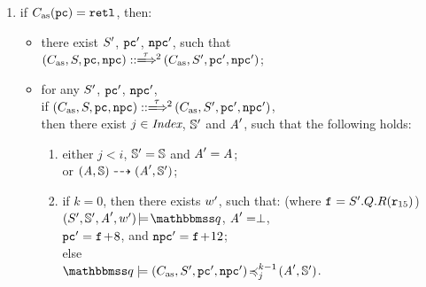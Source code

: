 \begin{definition}
\begin{enumerate}[1.]
        \item if {\em $C_{\text{as}}(\texttt{pc}) = \texttt{retl}{}$}, then:
            \begin{itemize}
                \item there exist $S'$, {\em $\texttt{pc}'$}, {\em $\texttt{npc}'$},
                such that \\
                   {\em $\LGlobMultiTrans{(\asmimp, \state, \pc, \npc)}
                            {\empmsg\,}{2}{(\asmimp, \state', \pc', \npc')}$};
                \item for any $S'$, {\em $\texttt{pc}'$}, {\em $\texttt{npc}'$}, \\
                    if {\em $\LGlobMultiTrans{(\asmimp, \state, \pc, \npc)}
                            {\empmsg\,}{2}{(\asmimp, \state', \pc', \npc')}$}, \\
                    then there exist $j \in \textit{Index}$, $\mathbb{S}'$ and
                    $\textit{A}'$, such that the following holds:
                    \begin{enumerate}
                        \item either $j < i$, $\mathbb{S}' = \mathbb{S}$
                            and $\textit{A}' = \textit{A}$; \\
                            or ${(\textit{A}, \mathbb{S})} \dashrightarrow {(\textit{A}', \mathbb{S}')}$;
                        \item if $k = 0$, then there exists
                        	$w'$, such that:
                        	(where {\em $\texttt{f}_{} = S'.Q.R(\texttt{r}_{15})$}) \\
                            \hspace*{2em}
                            $\asrtmodel{(\state', \hpstate', \primcom', \word')}
                                {\relastQ}$,
                            $\textit{A}' = \perp$, \\
                            \hspace*{2em}
                            {\em $\texttt{pc}' = \texttt{f}_{}\!+\!8$}, and
                            {\em $\texttt{npc}' = \texttt{f}_{}\!+\!12$}; \\
                            else \\
                            \hspace*{2em}
                            {\em $\simFunctionSt{\relastQ}{(\asmimp, \state', \pc', \npc')}
                                    {j}{k-1}{(\primcom', \hpstate')}$}.
                    \end{enumerate}
            \end{itemize}
    \end{enumerate}
\end{definition}

